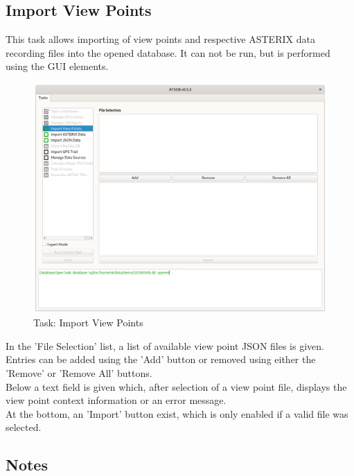 \subsection{Import View Points}
\label{sec:ui_import_viewpoints}

This task allows importing of view points and respective ASTERIX data recording files into the opened database. It can not be run, but is performed using the GUI elements. \\


\begin{figure}[H]
  \hspace*{-2.5cm}
    \includegraphics[width=19cm]{figures/view_point_import_task.png}
  \caption{Task: Import View Points}
\end{figure}

In the 'File Selection' list, a list of available view point JSON files is given. Entries can be added using the 'Add' button or removed using either the 'Remove' or 'Remove All' buttons. \\

Below a text field is given which, after selection of a view point file, displays the view point context information or an error message. \\

At the bottom, an 'Import' button exist, which is only enabled if a valid file was selected.

\subsection{Notes}

